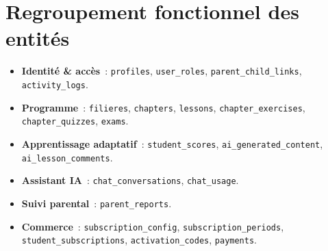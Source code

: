 \section{Regroupement fonctionnel des entités}
\begin{itemize}
  \item \textbf{Identité \& accès}~: \texttt{profiles}, \texttt{user\_roles},
        \texttt{parent\_child\_links}, \texttt{activity\_logs}.
  \item \textbf{Programme}~: \texttt{filieres}, \texttt{chapters},
        \texttt{lessons}, \texttt{chapter\_exercises}, \texttt{chapter\_quizzes},
        \texttt{exams}.
  \item \textbf{Apprentissage adaptatif}~: \texttt{student\_scores},
        \texttt{ai\_generated\_content}, \texttt{ai\_lesson\_comments}.
  \item \textbf{Assistant IA}~: \texttt{chat\_conversations}, \texttt{chat\_usage}.
  \item \textbf{Suivi parental}~: \texttt{parent\_reports}.
  \item \textbf{Commerce}~: \texttt{subscription\_config},
        \texttt{subscription\_periods}, \texttt{student\_subscriptions},
        \texttt{activation\_codes}, \texttt{payments}.
\end{itemize}
